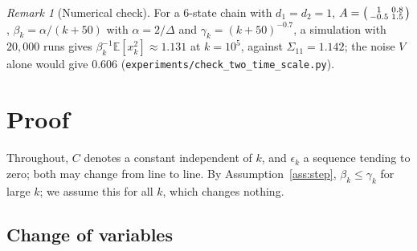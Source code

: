 \documentclass[11pt]{article}
\theoremstyle{definition}
\theoremstyle{remark}
\newtheorem{remark}[theorem]{Remark}
\newcommand{\E}{\mathbb{E}}
\begin{document}
\begin{remark}[Numerical check]
For a 6-state chain with $d_1 = d_2 = 1$, $A = \begin{psmallmatrix}1 & 0.8\\ -0.5 & 1.5\end{psmallmatrix}$,
$\beta_k = \alpha/(k + 50)$ with $\alpha = 2/\Delta$ and $\gamma_k = (k + 50)^{-0.7}$, a simulation with
$20{,}000$ runs gives $\beta_k^{-1}\E[x_k^2] \approx 1.131$ at $k = 10^5$, against
$\Sigma_{11} = 1.142$; the noise $V$ alone would give $0.606$
(\texttt{experiments/check\_two\_time\_scale.py}).
\end{remark}

\section{Proof}

Throughout, $C$ denotes a constant independent of $k$, and $\epsilon_k$ a sequence tending to
zero; both may change from line to line. By Assumption~\ref{ass:step},
$\beta_k\le\gamma_k$ for large $k$; we assume this for all $k$, which changes nothing.

\subsection{Change of variables}
\end{document}
